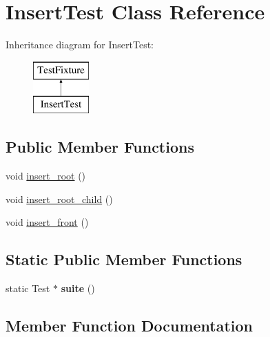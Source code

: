 \hypertarget{class_insert_test}{}\section{Insert\+Test Class Reference}
\label{class_insert_test}
Inheritance diagram for Insert\+Test\+:\begin{figure}[H]
\begin{center}
\leavevmode
\includegraphics[height=2.000000cm]{class_insert_test}
\end{center}
\end{figure}
\subsection*{Public Member Functions}
\begin{DoxyCompactItemize}
\item 
void \hyperlink{class_insert_test_a08b1a1c6b86e528795c49c20e019d701}{insert\+\_\+root} ()
\item 
void \hyperlink{class_insert_test_a0bab461bf75465f1f23a21a962266389}{insert\+\_\+root\+\_\+child} ()
\item 
void \hyperlink{class_insert_test_aed04f1b62d643e9d6bfa713930a1805b}{insert\+\_\+front} ()
\end{DoxyCompactItemize}
\subsection*{Static Public Member Functions}
\begin{DoxyCompactItemize}
\item 
\mbox{\label{class_insert_test_aebbf65f804a3b4af0545dc32211925a5}} 
static Test $\ast$ {\bfseries suite} ()
\end{DoxyCompactItemize}


\subsection{Member Function Documentation}
\mbox{\label{class_insert_test_aed04f1b62d643e9d6bfa713930a1805b}} 
